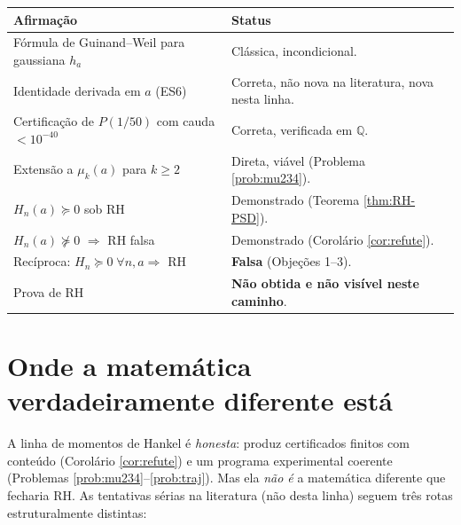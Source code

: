 \documentclass[12pt,a4paper]{article}
\begin{document}
\begin{center}
\renewcommand{\arraystretch}{1.35}
\begin{tabular}{p{6.5cm} p{8.5cm}}
\toprule
\textbf{Afirmação} & \textbf{Status} \\
\midrule
Fórmula de Guinand--Weil para gaussiana $h_a$ & Clássica, incondicional. \\
Identidade derivada em $a$ (ES6) & Correta, não nova na literatura,
nova nesta linha. \\
Certificação de $P(1/50)$ com cauda $<10^{-40}$ & Correta, verificada
em $\mathbb{Q}$. \\
Extensão a $\mu_k(a)$ para $k\ge 2$ & Direta, viável (Problema
\ref{prob:mu234}). \\
$H_n(a)\succeq 0$ sob RH & Demonstrado (Teorema \ref{thm:RH-PSD}). \\
$H_n(a)\not\succeq 0$ $\Rightarrow$ RH falsa & Demonstrado (Corolário
\ref{cor:refute}). \\
Recíproca: $H_n\succeq 0\;\forall n,a\Rightarrow$ RH & \textbf{Falsa}
(Objeções 1--3). \\
Prova de RH & \textbf{Não obtida e não visível neste caminho}. \\
\bottomrule
\end{tabular}
\end{center}

\section{Onde a matemática verdadeiramente diferente está}

A linha de momentos de Hankel é \emph{honesta}: produz certificados
finitos com conteúdo (Corolário \ref{cor:refute}) e um programa
experimental coerente (Problemas \ref{prob:mu234}--\ref{prob:traj}).
Mas ela \emph{não é} a matemática diferente que fecharia RH. As
tentativas sérias na literatura (não desta linha) seguem três rotas
estruturalmente distintas:
\end{document}
